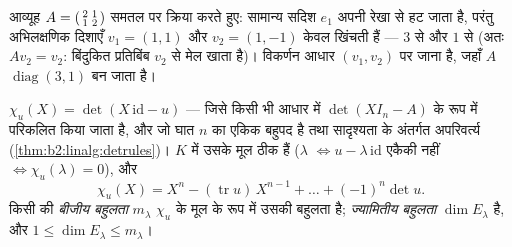 \begin{omfigure}

{\small आव्यूह $A = \begin{psmallmatrix}2 & 1\\ 1 &
2\end{psmallmatrix}$ समतल पर क्रिया करते हुए: सामान्य सदिश $e_1$ अपनी रेखा
से हट जाता है, परंतु अभिलक्षणिक दिशाएँ $v_1 =
(1,1)$ और $v_2 = (1,-1)$ केवल खिंचती हैं ---
$3$ से और $1$ से (अतः $Av_2 = v_2$: बिंदुकित प्रतिबिंब $v_2$ से मेल खाता है)।
विकर्णन आधार $(v_1, v_2)$ पर जाना है, जहाँ $A$ $\operatorname{diag}(3, 1)$ बन जाता है।}
\end{omfigure}

\begin{definition}[अभिलक्षणिक बहुपद]\label{def:b2:reduction:charpoly}
$\chi_u(X) = \det(X\,\mathrm{id} - u)$ --- जिसे किसी भी आधार में $\det(XI_n - A)$ के रूप में
परिकलित किया जाता है, और जो घात $n$ का एकिक बहुपद है तथा सादृश्यता के
अंतर्गत अपरिवर्त्य (\cref{thm:b2:linalg:detrules})। $K$ में उसके मूल ठीक  हैं
($\lambda$  $\iff u - \lambda\,\mathrm{id}$ एकैकी नहीं $\iff \chi_u(\lambda) = 0$), और
\[
\chi_u(X) = X^n - (\operatorname{tr} u)\, X^{n-1} + \dots +
(-1)^n \det u .
\]
किसी  की \emph{बीजीय बहुलता} $m_\lambda$
$\chi_u$ के मूल के रूप में उसकी बहुलता है; \emph{ज्यामितीय
बहुलता} $\dim E_\lambda$ है, और $1 \leq \dim E_\lambda \leq
m_\lambda$।
\end{definition}

